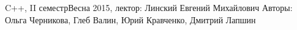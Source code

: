 


\BigHeader
	{C++, II семестр}{Весна 2015, лектор: Линский Евгений Михайлович}
	{Авторы: Ольга Черникова, Глеб Валин, Юрий Кравченко, Дмитрий Лапшин}

 






